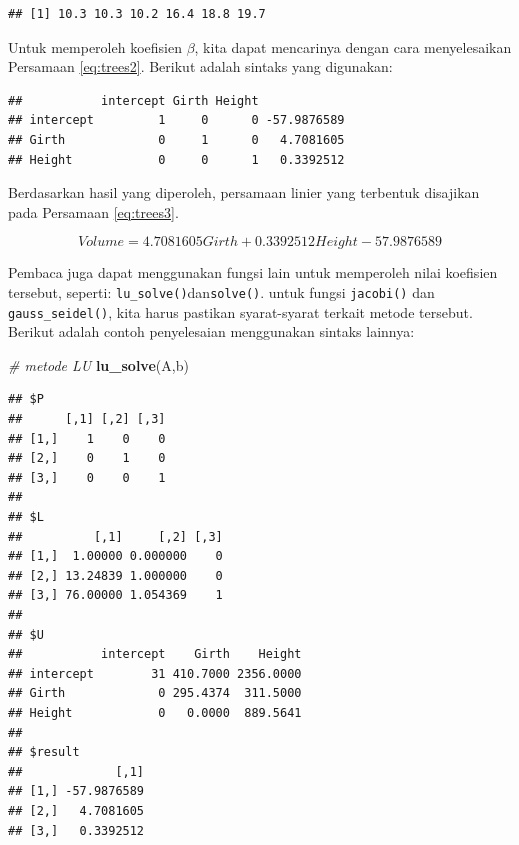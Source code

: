 \documentclass[]{book}
\newenvironment{Shaded}{\begin{snugshade}}{\end{snugshade}}
\newcommand{\CommentTok}[1]{\textcolor[rgb]{0.56,0.35,0.01}{\textit{#1}}}
\newcommand{\KeywordTok}[1]{\textcolor[rgb]{0.13,0.29,0.53}{\textbf{#1}}}
\newcommand{\NormalTok}[1]{#1}
\newcommand{\OperatorTok}[1]{\textcolor[rgb]{0.81,0.36,0.00}{\textbf{#1}}}
\newcommand{\StringTok}[1]{\textcolor[rgb]{0.31,0.60,0.02}{#1}}
\theoremstyle{definition}
\theoremstyle{definition}
\theoremstyle{definition}
\theoremstyle{remark}
\begin{document}
\begin{verbatim}
## [1] 10.3 10.3 10.2 16.4 18.8 19.7
\end{verbatim}

Untuk memperoleh koefisien \(\beta\), kita dapat mencarinya dengan cara menyelesaikan Persamaan \eqref{eq:trees2}. Berikut adalah sintaks yang digunakan:

\begin{Shaded}
\end{Shaded}

\begin{verbatim}
##           intercept Girth Height            
## intercept         1     0      0 -57.9876589
## Girth             0     1      0   4.7081605
## Height            0     0      1   0.3392512
\end{verbatim}

Berdasarkan hasil yang diperoleh, persamaan linier yang terbentuk disajikan pada Persamaan \eqref{eq:trees3}.

\begin{equation}
Volume=4.7081605 Girth + 0.3392512 Height  -57.9876589
 \label{eq:trees3}
\end{equation}

Pembaca juga dapat menggunakan fungsi lain untuk memperoleh nilai koefisien tersebut, seperti: \texttt{lu\_solve()}dan\texttt{solve()}. untuk fungsi \texttt{jacobi()} dan \texttt{gauss\_seidel()}, kita harus pastikan syarat-syarat terkait metode tersebut. Berikut adalah contoh penyelesaian menggunakan sintaks lainnya:

\begin{Shaded}
\begin{Highlighting}[]
\CommentTok{# metode LU}
\KeywordTok{lu_solve}\NormalTok{(A,b)}
\end{Highlighting}
\end{Shaded}

\begin{verbatim}
## $P
##      [,1] [,2] [,3]
## [1,]    1    0    0
## [2,]    0    1    0
## [3,]    0    0    1
## 
## $L
##          [,1]     [,2] [,3]
## [1,]  1.00000 0.000000    0
## [2,] 13.24839 1.000000    0
## [3,] 76.00000 1.054369    1
## 
## $U
##           intercept    Girth    Height
## intercept        31 410.7000 2356.0000
## Girth             0 295.4374  311.5000
## Height            0   0.0000  889.5641
## 
## $result
##             [,1]
## [1,] -57.9876589
## [2,]   4.7081605
## [3,]   0.3392512
\end{verbatim}
\end{document}

